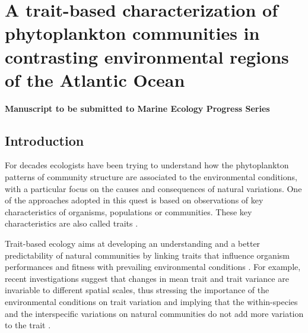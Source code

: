 \chapter{A trait-based characterization of phytoplankton communities in contrasting environmental regions of the Atlantic Ocean}

\small {\textbf{Manuscript to be submitted to Marine Ecology Progress Series}}


\normalsize
\section{Introduction}
For decades ecologists have been trying to understand how the phytoplankton patterns of community structure are associated to the environmental conditions, with a particular focus on the causes and consequences of natural variations. One of the approaches adopted in this quest is based on observations of key characteristics of organisms, populations or communities. These key characteristics are also called traits \citep{McGill2006, Violle2007}. 

Trait-based ecology aims at developing an understanding and a better predictability of natural communities by linking traits that influence organism performances and fitness with prevailing environmental conditions \citep{McGill2006}. For example, recent investigations suggest that changes in mean trait and trait variance are invariable to different spatial scales, thus stressing the importance of the environmental conditions on trait variation and implying that the within-species and the interspecific variations on natural communities do not add more variation to the trait \citep{Messier2010}. 

